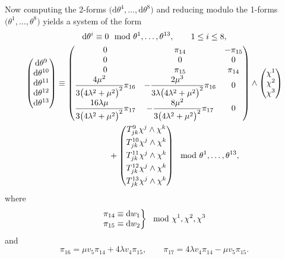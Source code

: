 \documentclass[pdftex]{sigma}
\numberwithin{equation}{section}
\renewcommand{\d}{\mathrm{d}}%
\begin{document}
Now computing the 2-forms $\big(\d\theta^4,\ldots,\d\theta^8\big)$ and reducing modulo the 1-forms $\big(\theta^1,\ldots,\theta^8\big)$ yields a system of the form
\begin{gather}
\d\theta^i \equiv 0 \mod{\theta^1, \ldots, \theta^{13}}, \qquad 1 \leq i \leq 8, \nonumber\\
\begin{pmatrix} \d\theta^9 \\ \d\theta^{10} \\ \d\theta^{11} \\ \d\theta^{12} \\ \d\theta^{13} \end{pmatrix} \equiv
\begin{pmatrix}
0 & \pi_{14} & -\pi_{15} \\
0 & 0 & 0 \\
0 & \pi_{15} & \pi_{14} \\
\displaystyle{\frac{4\mu^2}{3 \big(4\lambda^2 + \mu^2\big)^2}} \pi_{16} &
\displaystyle{-\frac{2 \mu^3}{3\lambda \big(4\lambda^2 + \mu^2\big)^2}} \pi_{16}
& 0 \\
\displaystyle{\frac{16\lambda\mu}{3\big(4\lambda^2 + \mu^2\big)^2}} \pi_{17} &
\displaystyle{-\frac{8\mu^2}{3\big(4\lambda^2 + \mu^2\big)^2}} \pi_{17}
& 0
\end{pmatrix} \wedge \begin{pmatrix} \chi^1 \\ \chi^2 \\ \chi^3 \end{pmatrix}\nonumber \\
\hphantom{\begin{pmatrix} \d\theta^9 \\ \d\theta^{10} \\ \d\theta^{11} \\ \d\theta^{12} \\ \d\theta^{13} \end{pmatrix} \equiv}{} +
\begin{pmatrix} T^9_{jk} \chi^j \wedge \chi^k \vspace{1mm}\\ T^{10}_{jk} \chi^j \wedge \chi^k \vspace{1mm}\\ T^{11}_{jk} \chi^j \wedge \chi^k \vspace{1mm}\\ T^{12}_{jk} \chi^j \wedge \chi^k \vspace{1mm}\\ T^{13}_{jk} \chi^j \wedge \chi^k \end{pmatrix} \mod{\theta^1, \ldots, \theta^{13}}, \label{ugly-tableau}
\end{gather}
where
\[
\left. \begin{array}{@{}l@{}}
\pi_{14} \equiv \d w_1 \\
\pi_{15} \equiv \d w_2
\end{array} \right\} \mod{\chi^1, \chi^2, \chi^3}
\]
and
\[ \pi_{16} = \mu v_5 \pi_{14} + 4 \lambda v_4 \pi_{15} , \qquad \pi_{17} = 4\lambda v_4 \pi_{14} - \mu v_5 \pi_{15}. \]
\end{document}

